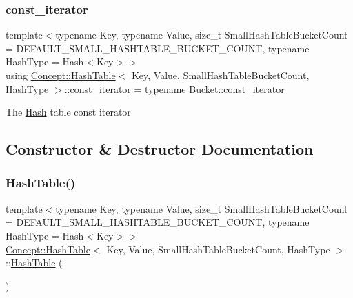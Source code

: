 \subsubsection{\texorpdfstring{const\_iterator}{const\_iterator}}
{\footnotesize\ttfamily template$<$typename Key, typename Value, size\+\_\+t Small\+Hash\+Table\+Bucket\+Count = D\+E\+F\+A\+U\+L\+T\+\_\+\+S\+M\+A\+L\+L\+\_\+\+H\+A\+S\+H\+T\+A\+B\+L\+E\+\_\+\+B\+U\+C\+K\+E\+T\+\_\+\+C\+O\+U\+NT, typename Hash\+Type = Hash$<$\+Key$>$$>$ \\
using \mbox{\hyperlink{class_concept_1_1_hash_table}{Concept\+::\+Hash\+Table}}$<$ Key, Value, Small\+Hash\+Table\+Bucket\+Count, Hash\+Type $>$\+::\mbox{\hyperlink{class_concept_1_1_hash_table_a567c99ad671a5065563483689abdf399}{const\+\_\+iterator}} =  typename Bucket\+::const\+\_\+iterator}

The \mbox{\hyperlink{class_concept_1_1_hash}{Hash}} table const iterator 

\subsection{Constructor \& Destructor Documentation}
\mbox{\label{class_concept_1_1_hash_table_a5a2046a7319fe85a746fc2bbfef8c55d}} 
\subsubsection{\texorpdfstring{HashTable()}{HashTable()}}
{\footnotesize\ttfamily template$<$typename Key, typename Value, size\+\_\+t Small\+Hash\+Table\+Bucket\+Count = D\+E\+F\+A\+U\+L\+T\+\_\+\+S\+M\+A\+L\+L\+\_\+\+H\+A\+S\+H\+T\+A\+B\+L\+E\+\_\+\+B\+U\+C\+K\+E\+T\+\_\+\+C\+O\+U\+NT, typename Hash\+Type = Hash$<$\+Key$>$$>$ \\
\mbox{\hyperlink{class_concept_1_1_hash_table}{Concept\+::\+Hash\+Table}}$<$ Key, Value, Small\+Hash\+Table\+Bucket\+Count, Hash\+Type $>$\+::\mbox{\hyperlink{class_concept_1_1_hash_table}{Hash\+Table}} (\begin{DoxyParamCaption}{ }\end{DoxyParamCaption})\hspace{0.3cm}{\ttfamily [inline]}}

